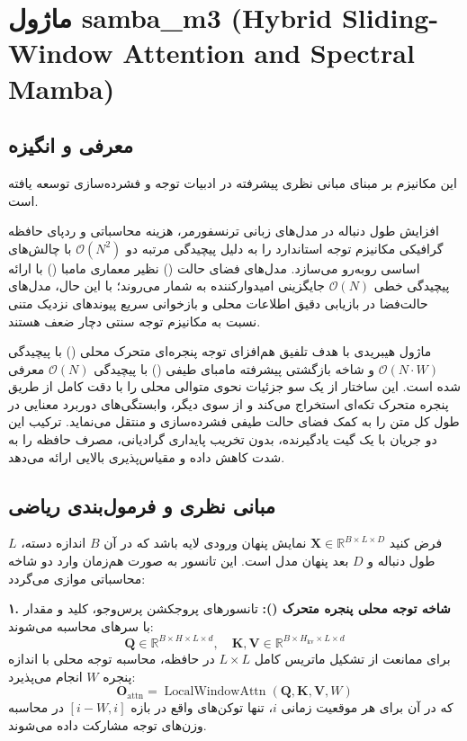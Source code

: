 \section{ماژول samba\_m3 (Hybrid Sliding-Window Attention and Spectral Mamba)}
\label{sec:module_samba_m3}

\subsection{معرفی و انگیزه}
این مکانیزم بر مبنای مبانی نظری پیشرفته در ادبیات توجه و فشرده‌سازی \cite{ren2024samba} توسعه یافته است.

افزایش طول دنباله در مدل‌های زبانی ترنسفورمر، هزینه محاسباتی و ردپای حافظه گرافیکی مکانیزم توجه استاندارد را به دلیل پیچیدگی مرتبه دو $\mathcal{O}(N^2)$ با چالش‌های اساسی روبه‌رو می‌سازد. مدل‌های فضای حالت () نظیر معماری مامبا () با ارائه پیچیدگی خطی $\mathcal{O}(N)$ جایگزینی امیدوارکننده به شمار می‌روند؛ با این حال، مدل‌های حالت‌فضا در بازیابی دقیق اطلاعات محلی و بازخوانی سریع پیوندهای نزدیک متنی نسبت به مکانیزم توجه سنتی دچار ضعف هستند.

ماژول هیبریدی  با هدف تلفیق هم‌افزای توجه پنجره‌ای متحرک محلی () با پیچیدگی $\mathcal{O}(N \cdot W)$ و شاخه بازگشتی پیشرفته مامبای طیفی () با پیچیدگی $\mathcal{O}(N)$ معرفی شده است. این ساختار از یک سو جزئیات نحوی متوالی محلی را با دقت کامل از طریق پنجره متحرک تکه‌ای استخراج می‌کند و از سوی دیگر، وابستگی‌های دوربرد معنایی در طول کل متن را به کمک فضای حالت طیفی فشرده‌سازی و منتقل می‌نماید. ترکیب این دو جریان با یک گیت یادگیرنده، بدون تخریب پایداری گرادیانی، مصرف حافظه را به شدت کاهش داده و مقیاس‌پذیری بالایی ارائه می‌دهد.

\subsection{مبانی نظری و فرمول‌بندی ریاضی}
فرض کنید $\mathbf{X} \in \mathbb{R}^{B \times L \times D}$ نمایش پنهان ورودی لایه باشد که در آن $B$ اندازه دسته، $L$ طول دنباله و $D$ بعد پنهان مدل است. این تانسور به صورت هم‌زمان وارد دو شاخه محاسباتی موازی می‌گردد:

\textbf{۱. شاخه توجه محلی پنجره متحرک ():}
تانسورهای پروجکشن پرس‌وجو، کلید و مقدار با سرهای  محاسبه می‌شوند:
\begin{equation}
\mathbf{Q} \in \mathbb{R}^{B \times H \times L \times d}, \quad \mathbf{K}, \mathbf{V} \in \mathbb{R}^{B \times H_{\text{kv}} \times L \times d}
\end{equation}
برای ممانعت از تشکیل ماتریس کامل $L \times L$ در حافظه، محاسبه توجه محلی با اندازه پنجره $W$ انجام می‌پذیرد:
\begin{equation}
\mathbf{O}_{\text{attn}} = \operatorname{LocalWindowAttn}(\mathbf{Q}, \mathbf{K}, \mathbf{V}, W)
\end{equation}
که در آن برای هر موقعیت زمانی $i$، تنها توکن‌های واقع در بازه $[i-W, i]$ در محاسبه وزن‌های توجه مشارکت داده می‌شوند.

